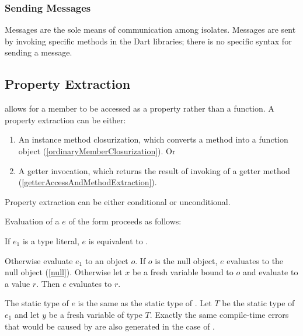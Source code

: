 \documentclass[makeidx]{article}
\begin{document}
\subsubsection{Sending Messages}

\LMHash{}%
Messages are the sole means of communication among isolates.
Messages are sent by invoking specific methods in the Dart libraries; there is no specific syntax for sending a message.



\subsection{Property Extraction}

\LMHash{}%
allows for a member to be accessed as a property rather than a function.
A property extraction can be either:
\begin{enumerate}
\item An instance method closurization,
which converts a method into a function object
(\ref{ordinaryMemberClosurization}).
Or
\item A getter invocation, which returns the result of invoking of a getter method
(\ref{getterAccessAndMethodExtraction}).
\end{enumerate}


Property extraction can be either conditional or unconditional.

\LMHash{}%
Evaluation of a 
$e$ of the form  proceeds as follows:

\LMHash{}%
If $e_1$ is a type literal, $e$ is equivalent to .

\LMHash{}%
Otherwise evaluate $e_1$ to an object $o$.
If $o$ is the null object, $e$ evaluates to the null object (\ref{null}).
Otherwise let $x$ be a fresh variable bound to $o$
and evaluate  to a value $r$.
Then $e$ evaluates to $r$.

The static type of $e$ is the same as the static type of .
Let $T$ be the static type of $e_1$ and let $y$ be a fresh variable of type $T$.
Exactly the same compile-time errors that would be caused by  are also generated in the case of .
\end{document}
